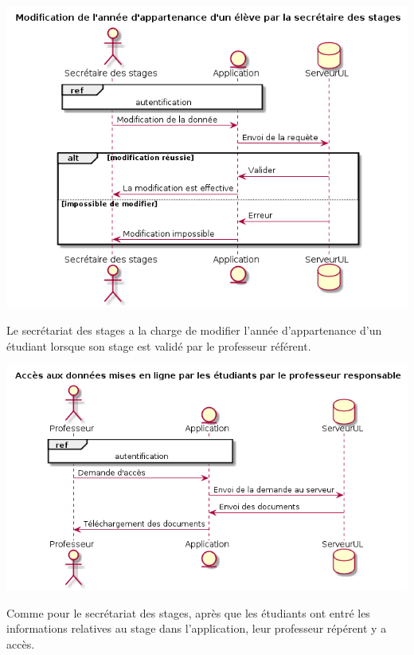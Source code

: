\documentclass{scrreprt}
\begin{document}
\begin{center}
	\includegraphics[scale=0.55]{image/modifAnneeParSecretaire.png}
\end{center}
\hspace{1cm}Le secrétariat des stages a la charge de modifier l'année d'appartenance d'un étudiant lorsque son stage est validé par le professeur référent.

\begin{center}
	\includegraphics[scale=0.55]{image/accesDonneesParProfesseur.png}
\end{center}
\hspace{1cm}Comme pour le secrétariat des stages, après que les étudiants ont entré les informations relatives au stage dans l'application, leur professeur répérent y a accès.
\end{document}
